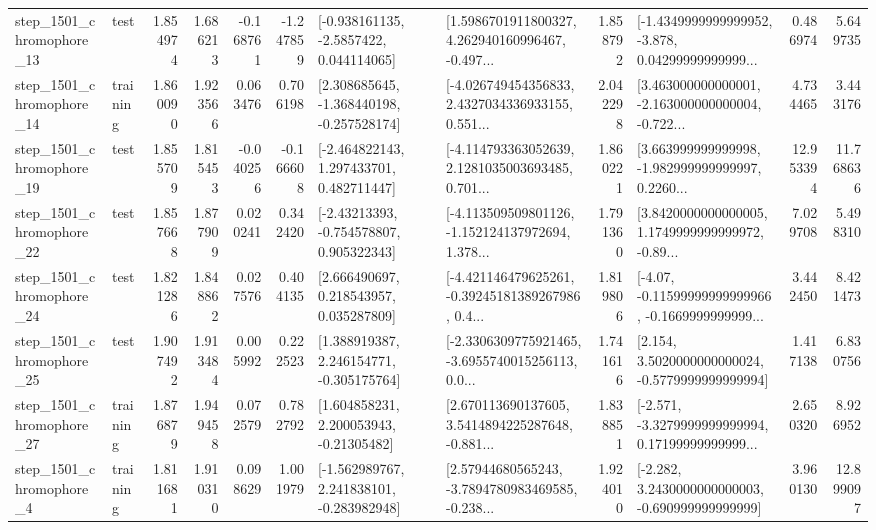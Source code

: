 \begin{tabular}{llrrrrllrlrr}
 step\_1501\_chromophore\_13 &      test &      1.854974 &    1.686213 &     -0.168761 & -1.247859 &     [-0.938161135, -2.5857422, 0.044114065] &  [1.5986701911800327, 4.262940160996467, -0.497... &       1.858792 &  [-1.4349999999999952, -3.878, 0.04299999999999... &            0.486974 &          5.649735 \\
 step\_1501\_chromophore\_14 &  training &      1.860090 &    1.923566 &      0.063476 &  0.706198 &   [2.308685645, -1.368440198, -0.257528174] &  [-4.026749454356833, 2.4327034336933155, 0.551... &       2.042298 &  [3.463000000000001, -2.163000000000004, -0.722... &            4.734465 &          3.443176 \\
 step\_1501\_chromophore\_19 &      test &      1.855709 &    1.815453 &     -0.040256 & -0.166608 &    [-2.464822143, 1.297433701, 0.482711447] &  [-4.114793363052639, 2.1281035003693485, 0.701... &       1.860221 &  [3.663999999999998, -1.982999999999997, 0.2260... &           12.953394 &         11.768636 \\
 step\_1501\_chromophore\_22 &      test &      1.857668 &    1.877909 &      0.020241 &  0.342420 &    [-2.43213393, -0.754578807, 0.905322343] &  [-4.113509509801126, -1.152124137972694, 1.378... &       1.791360 &  [3.8420000000000005, 1.1749999999999972, -0.89... &            7.029708 &          5.498310 \\
 step\_1501\_chromophore\_24 &      test &      1.821286 &    1.848862 &      0.027576 &  0.404135 &     [2.666490697, 0.218543957, 0.035287809] &  [-4.421146479625261, -0.39245181389267986, 0.4... &       1.819806 &  [-4.07, -0.11599999999999966, -0.1669999999999... &            3.442450 &          8.421473 \\
 step\_1501\_chromophore\_25 &      test &      1.907492 &    1.913484 &      0.005992 &  0.222523 &    [1.388919387, 2.246154771, -0.305175764] &  [-2.3306309775921465, -3.6955740015256113, 0.0... &       1.741616 &   [2.154, 3.5020000000000024, -0.5779999999999994] &            1.417138 &          6.830756 \\
 step\_1501\_chromophore\_27 &  training &      1.876879 &    1.949458 &      0.072579 &  0.782792 &     [1.604858231, 2.200053943, -0.21305482] &  [2.670113690137605, 3.5414894225287648, -0.881... &       1.838851 &  [-2.571, -3.3279999999999994, 0.17199999999999... &            2.650320 &          8.926952 \\
  step\_1501\_chromophore\_4 &  training &      1.811681 &    1.910310 &      0.098629 &  1.001979 &   [-1.562989767, 2.241838101, -0.283982948] &  [2.57944680565243, -3.7894780983469585, -0.238... &       1.924010 &   [-2.282, 3.2430000000000003, -0.690999999999999] &            3.960130 &         12.899097 \\

\end{tabular}
